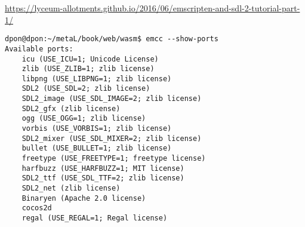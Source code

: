 

\url{https://lyceum-allotments.github.io/2016/06/emscripten-and-sdl-2-tutorial-part-1/}

\begin{verbatim}
dpon@dpon:~/metaL/book/web/wasm$ emcc --show-ports
Available ports:
    icu (USE_ICU=1; Unicode License)
    zlib (USE_ZLIB=1; zlib license)
    libpng (USE_LIBPNG=1; zlib license)
    SDL2 (USE_SDL=2; zlib license)
    SDL2_image (USE_SDL_IMAGE=2; zlib license)
    SDL2_gfx (zlib license)
    ogg (USE_OGG=1; zlib license)
    vorbis (USE_VORBIS=1; zlib license)
    SDL2_mixer (USE_SDL_MIXER=2; zlib license)
    bullet (USE_BULLET=1; zlib license)
    freetype (USE_FREETYPE=1; freetype license)
    harfbuzz (USE_HARFBUZZ=1; MIT license)
    SDL2_ttf (USE_SDL_TTF=2; zlib license)
    SDL2_net (zlib license)
    Binaryen (Apache 2.0 license)
    cocos2d
    regal (USE_REGAL=1; Regal license)
\end{verbatim}
    
